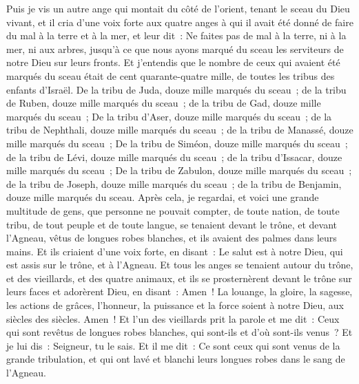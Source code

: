 \begin{multicols}{2}
Puis je vis un autre ange qui montait du côté de l'orient, tenant le sceau du Dieu vivant, et il cria d'une voix forte aux quatre anges à qui il avait été donné de faire du mal à la terre et à la mer,
et leur dit~: Ne faites pas de mal à la terre, ni à la mer, ni aux arbres, jusqu'à ce que nous ayons marqué du sceau les serviteurs de notre Dieu sur leurs fronts.
Et j'entendis que le nombre de ceux qui avaient été marqués du sceau était de cent quarante-quatre mille, de toutes les tribus des enfants d'Israël.
De la tribu de Juda, douze mille marqués du sceau~; de la tribu de Ruben, douze mille marqués du sceau~; de la tribu de Gad, douze mille marqués du sceau~;
De la tribu d'Aser, douze mille marqués du sceau~; de la tribu de Nephthali, douze mille marqués du sceau~; de la tribu de Manassé, douze mille marqués du sceau~;
De la tribu de Siméon, douze mille marqués du sceau~; de la tribu de Lévi, douze mille marqués du sceau~; de la tribu d'Issacar, douze mille marqués du sceau~;
De la tribu de Zabulon, douze mille marqués du sceau~; de la tribu de Joseph, douze mille marqués du sceau~; de la tribu de Benjamin, douze mille marqués du sceau.
Après cela, je regardai, et voici une grande multitude de gens, que personne ne pouvait compter, de toute nation, de toute tribu, de tout peuple et de toute langue, se tenaient devant le trône, et devant l'Agneau, vêtus de longues robes blanches, et ils avaient des palmes dans leurs mains.
Et ils criaient d'une voix forte, en disant~: Le salut est à notre Dieu, qui est assis sur le trône, et à l'Agneau.
Et tous les anges se tenaient autour du trône, et des vieillards, et des quatre animaux, et ils se prosternèrent devant le trône sur leurs faces et adorèrent Dieu,
en disant~: Amen~! La louange, la gloire, la sagesse, les actions de grâces, l'honneur, la puissance et la force soient à notre Dieu, aux siècles des siècles. Amen~!
Et l'un des vieillards prit la parole et me dit~: Ceux qui sont revêtus de longues robes blanches, qui sont-ils et d'où sont-ils venus~?
Et je lui dis~: Seigneur, tu le sais. Et il me dit~: Ce sont ceux qui sont venus de la grande tribulation, et qui ont lavé et blanchi leurs longues robes dans le sang de l'Agneau.

\end{multicols}
